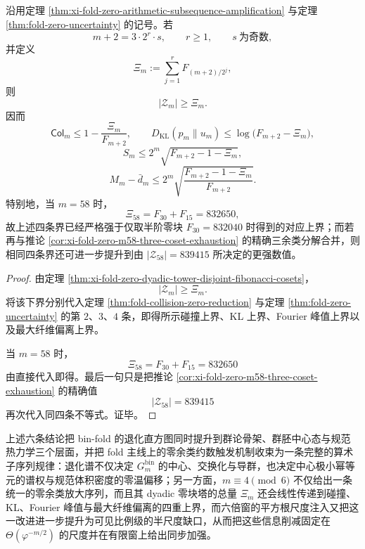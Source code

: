 \begin{theorem}\label{thm:xi-fold-zero-dyadic-tower-synchronous-information-gap-improvement}\label{thm:xi-fold-zero-multiple6-information-gap-improvement}
沿用定理 \ref{thm:xi-fold-zero-arithmetic-subsequence-amplification} 与定理 \ref{thm:fold-zero-uncertainty} 的记号。若
\[
m+2=3\cdot 2^r\cdot s,
\qquad
r\ge 1,
\qquad
s\ \text{为奇数},
\]
并定义
\[
\Xi_m:=\sum_{j=1}^{r}F_{(m+2)/2^j},
\]
则
\[
|\mathcal Z_m|\ge \Xi_m.
\]
因而
\[
\mathsf{Col}_m
\le
1-\frac{\Xi_m}{F_{m+2}},
\qquad
D_{\mathrm{KL}}(p_m\|u_m)
\le
\log\!\bigl(F_{m+2}-\Xi_m\bigr),
\]
\[
S_m\le 2^m\sqrt{F_{m+2}-1-\Xi_m},
\]
\[
M_m-\bar d_m
\le
2^m\sqrt{\frac{F_{m+2}-1-\Xi_m}{F_{m+2}}}.
\]
特别地，当 \(m=58\) 时，
\[
\Xi_{58}=F_{30}+F_{15}=832650,
\]
故上述四条界已经严格强于仅取半阶零块 \(F_{30}=832040\) 时得到的对应上界；而若再与推论 \ref{cor:xi-fold-zero-m58-three-coset-exhaustion} 的精确三余类分解合并，则相同四条界还可进一步提升到由 \(|\mathcal Z_{58}|=839415\) 所决定的更强数值。
\end{theorem}
\begin{proof}
由定理 \ref{thm:xi-fold-zero-dyadic-tower-disjoint-fibonacci-cosets}，
\[
|\mathcal Z_m|\ge \Xi_m.
\]
将该下界分别代入定理 \ref{thm:fold-collision-zero-reduction} 与定理
\ref{thm:fold-zero-uncertainty} 的第 \(2\)、\(3\)、\(4\) 条，即得所示碰撞上界、KL 上界、Fourier 峰值上界以及最大纤维偏离上界。

当 \(m=58\) 时，
\[
\Xi_{58}=F_{30}+F_{15}=832650
\]
由直接代入即得。最后一句只是把推论
\ref{cor:xi-fold-zero-m58-three-coset-exhaustion} 的精确值
\[
|\mathcal Z_{58}|=839415
\]
再次代入同四条不等式。证毕。
\end{proof}

\noindent
上述六条结论把 bin-fold 的退化直方图同时提升到群论骨架、群胚中心态与规范热力学三个层面，并把 fold 主线上的零余类约数触发机制收束为一条完整的算术子序列规律：退化谱不仅决定 \(G_m^{\mathrm{bin}}\) 的中心、交换化与导群，也决定中心极小幂等元的谱权与规范体积密度的零温偏移；另一方面，\(m\equiv 4\pmod 6\) 不仅给出一条统一的零余类放大序列，而且其 dyadic 零块塔的总量 \(\Xi_m\) 还会线性传递到碰撞、KL、Fourier 峰值与最大纤维偏离的四重上界，而六倍窗的平方根尺度注入又把这一改进进一步提升为可见比例级的半尺度缺口，从而把这些信息削减固定在 \(\Theta(\varphi^{-m/2})\) 的尺度并在有限窗上给出同步加强。

\endinput
